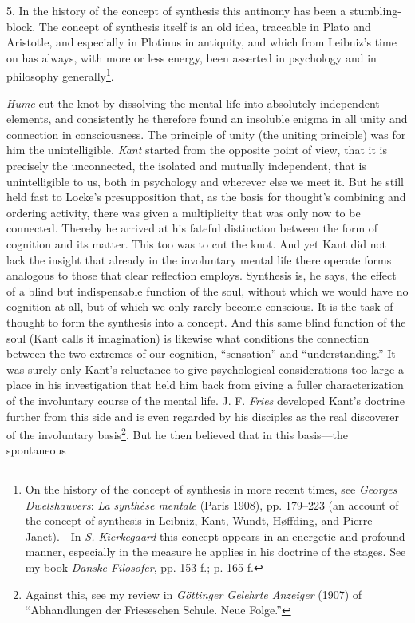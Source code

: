 \documentclass[12pt,a4paper]{book}
\newcommand{\opage}[1]{\marginnote{\footnotesize\textit{[#1]}}}
\begin{document}
5. In the history of the concept of synthesis this antinomy has been a
stumbling-block. The concept of synthesis itself is an old idea,
traceable in Plato and Aristotle, and especially in Plotinus in
antiquity, and which from Leibniz's time on has always, with more or
less energy, been asserted in psychology and in philosophy
generally\footnote{On the history of the concept of synthesis in more
recent times, see \emph{Georges Dwelshauvers}: \emph{La synthèse
mentale} (Paris 1908), pp. 179--223 (an account of the concept of
synthesis in Leibniz, Kant, Wundt, Høffding, and Pierre Janet).---In
\emph{S. Kierkegaard} this concept appears in an energetic and profound
manner, especially in the measure he applies in his doctrine of the
stages. See my book \emph{Danske Filosofer}, pp. 153 f.; p. 165 f.}.

\emph{Hume} cut the knot by dissolving the mental life into absolutely
independent elements, and consistently he therefore found an insoluble
enigma in all unity and connection in consciousness. The principle of
unity (the uniting principle) was for him the unintelligible. \emph{Kant}
started from the opposite point of view, that it is precisely the
unconnected, the isolated and mutually independent, that is
unintelligible to us, both in psychology and wherever else we meet it.
But he still held fast to Locke's presupposition that, as the basis for
\opage{16}thought's combining and ordering activity, there was given a
multiplicity that was only now to be connected. Thereby he arrived at
his fateful distinction between the form of cognition and its matter.
This too was to cut the knot. And yet Kant did not lack the insight that
already in the involuntary mental life there operate forms analogous to
those that clear reflection employs. Synthesis is, he says, the effect of
a blind but indispensable function of the soul, without which we would
have no cognition at all, but of which we only rarely become conscious.
It is the task of thought to form the synthesis into a concept. And this
same blind function of the soul (Kant calls it imagination) is likewise
what conditions the connection between the two extremes of our cognition,
``sensation'' and ``understanding.'' It was surely only Kant's
reluctance to give psychological considerations too large a place in his
investigation that held him back from giving a fuller characterization
of the involuntary course of the mental life. J. F. \emph{Fries}
developed Kant's doctrine further from this side and is even regarded by
his disciples as the real discoverer of the involuntary
basis\footnote{Against this, see my review in \emph{Göttinger Gelehrte
Anzeiger} (1907) of ``Abhandlungen der Frieseschen Schule. Neue
Folge.''}. But he then believed that in this basis---the spontaneous
\end{document}
